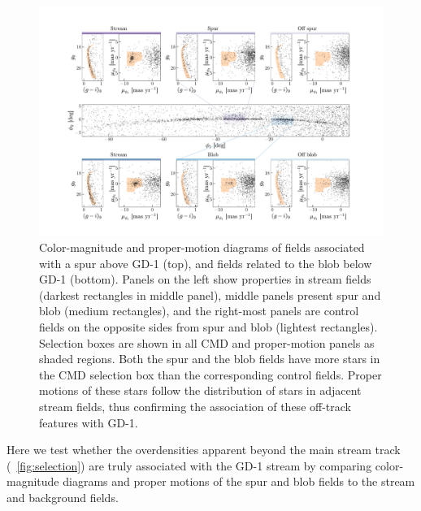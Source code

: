 \documentclass[modern]{aastex62}
\newcommand{\gaia}{\textsl{Gaia}}
\begin{document}
\begin{figure}
\begin{center}
\includegraphics[width=\textwidth]{features.pdf}
\end{center}
\caption{
Color-magnitude and proper-motion diagrams of fields associated with a spur above GD-1 (top), and fields related to the blob below GD-1 (bottom).
Panels on the left show properties in stream fields (darkest rectangles in middle panel), middle panels present spur and blob (medium rectangles), and the right-most panels are control fields on the opposite sides from spur and blob (lightest rectangles).
Selection boxes are shown in all CMD and proper-motion panels as shaded regions.
Both the spur and the blob fields have more stars in the CMD selection box than the corresponding control fields.
Proper motions of these stars follow the distribution of stars in adjacent stream fields, thus confirming the association of these off-track features with GD-1.
}
\label{fig:features}
\end{figure}

Here we test whether the overdensities apparent beyond the main stream track
(\figurename~\ref{fig:selection}) are truly associated with the GD-1 stream by
comparing color-magnitude diagrams and proper motions of the spur and blob
fields to the stream and background fields.
\end{document}
